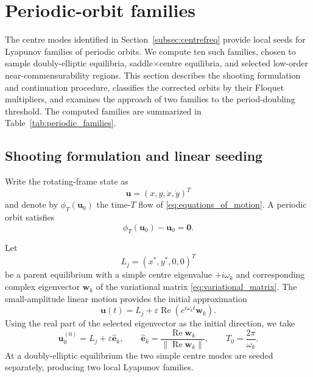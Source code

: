 \section{Periodic-orbit families}
\label{sec:periodic}

The centre modes identified in Section~\ref{subsec:centrefreq} provide
local seeds for Lyapunov families of periodic orbits. We compute ten such
families, chosen to sample doubly-elliptic equilibria, saddle$\times$centre
equilibria, and selected low-order near-commensurability regions. This
section describes the shooting formulation and continuation procedure,
classifies the corrected orbits by their Floquet multipliers, and examines
the approach of two families to the period-doubling threshold. The computed
families are summarized in Table~\ref{tab:periodic_families}.




\subsection{Shooting formulation and linear seeding}
\label{subsec:periodic_shooting}

Write the rotating-frame state as
\[
\mathbf u=(x,y,\dot{x},\dot{y})^T
\]
and denote by $\phi_T(\mathbf u_0)$ the time-$T$ flow of
\eqref{eq:equations_of_motion}. A periodic orbit satisfies
\begin{equation}
\phi_T(\mathbf u_0)-\mathbf u_0=\mathbf 0.
\label{eq:periodicity_residual}
\end{equation}

Let
\[
L_j=(x^\ast,y^\ast,0,0)^T
\]
be a parent equilibrium with a simple centre eigenvalue
$+i\omega_k$ and corresponding complex eigenvector $\mathbf w_k$ of the
variational matrix \eqref{eq:variational_matrix}. The small-amplitude
linear motion provides the initial approximation
\[
\mathbf u(t)
=
L_j+
\varepsilon
\operatorname{Re}
\left(
e^{i\omega_k t}\mathbf w_k
\right).
\]
Using the real part of the selected eigenvector as the initial direction,
we take
\begin{equation}
\mathbf u_0^{(0)}
=
L_j+\varepsilon\widehat{\mathbf e}_k,
\qquad
\widehat{\mathbf e}_k
=
\frac{\operatorname{Re}\mathbf w_k}
{\|\operatorname{Re}\mathbf w_k\|},
\qquad
T_0=\frac{2\pi}{\omega_k}.
\label{eq:linear_periodic_seed}
\end{equation}
At a doubly-elliptic equilibrium the two simple centre modes are seeded
separately, producing two local Lyapunov families.

